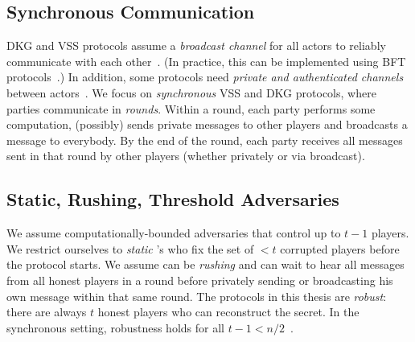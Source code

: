\subsection{Synchronous Communication}
DKG and VSS protocols assume a \textit{broadcast channel} for all actors to reliably communicate with each other~\cite{CGMA85,Pedersen1991AThreshold}.
(In practice, this can be implemented using BFT protocols~\cite{SJSW19}.)
In addition, some protocols need \textit{private and authenticated channels} between actors~\cite{Feldman87,Pedersen1991AThreshold,KZG10a,GJKR07,Kate2010}.
We focus on \textit{synchronous} VSS and DKG protocols, where parties communicate in \textit{rounds}.
Within a round, each party performs some computation, (possibly) sends private messages to other players and broadcasts a message to everybody.
By the end of the round, each party receives all messages sent in that round by other players (whether privately or via broadcast).

\subsection{Static, Rushing, Threshold Adversaries}
We assume computationally-bounded adversaries \Adv that control up to $t-1$ players.
We restrict ourselves to \textit{static} \Adv's who fix the set of $<t$ corrupted players before the protocol starts.
We assume \Adv can be \textit{rushing} and can wait to hear all messages from all honest players in a round before privately sending or broadcasting his own message within that same round.
The protocols in this thesis are \textit{robust}: there are always $t$ honest players who can reconstruct the secret.
In the synchronous setting, robustness holds for all $t - 1 < n/2$~\cite{GJKR07}.
